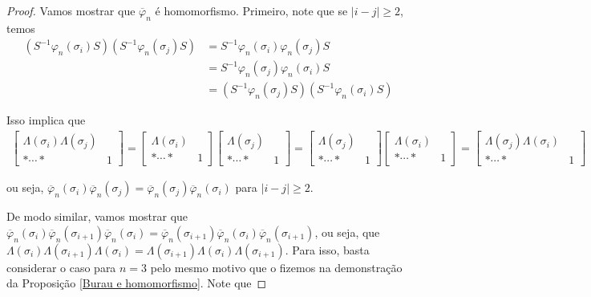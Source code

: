 	\begin{proof}
		Vamos mostrar que $\overline{\varphi}_n$ é homomorfismo. Primeiro, note que se $|i-j|\geq 2$, temos
		\begin{align*}
		(S^{-1}\varphi_n(\sigma_i)S)(S^{-1}\varphi_n(\sigma_j)S) &= S^{-1}\varphi_n(\sigma_i)\varphi_n(\sigma_j)S \\ 
		&= S^{-1}\varphi_n(\sigma_j)\varphi_n(\sigma_i)S \\
		&= (S^{-1}\varphi_n(\sigma_j)S)(S^{-1}\varphi_n(\sigma_i)S)
		\end{align*}
		\par\vspace{0.3cm} Isso implica que
		\begin{align*}
		\left[ \begin{array}{c|c}
		\Lambda(\sigma_i)\Lambda(\sigma_j) & \\
		\hline
		\ast\cdots\ast & 1
		\end{array}\right] = 
		\left[ \begin{array}{c|c}
		\Lambda(\sigma_i) & \\
		\hline
		\ast\cdots\ast & 1
		\end{array}\right]\left[ \begin{array}{c|c}
		\Lambda(\sigma_j) & \\
		\hline
		\ast\cdots\ast & 1
		\end{array}\right]  = \left[\begin{array}{c|c}
		\Lambda(\sigma_j) & \\
		\hline
		\ast\cdots\ast & 1
		\end{array}\right]\left[ \begin{array}{c|c}
		\Lambda(\sigma_i) & \\
		\hline
		\ast\cdots\ast & 1
		\end{array}\right] =  \left[\begin{array}{c|c}
		\Lambda(\sigma_j)\Lambda(\sigma_i) & \\
		\hline
		\ast\cdots\ast & 1
		\end{array}\right]
		\end{align*}
		\par\vspace{0.3cm} ou seja, $\overline{\varphi}_n(\sigma_i)\overline{\varphi}_n(\sigma_j) = \overline{\varphi}_n(\sigma_j)\overline{\varphi}_n(\sigma_i)$ para $|i-j|\geq 2$.
		\par\vspace{0.3cm} De modo similar, vamos mostrar que $\overline{\varphi}_n(\sigma_i)\overline{\varphi}_n(\sigma_{i+1})\overline{\varphi}_n(\sigma_i) = \overline{\varphi}_n(\sigma_{i+1})\overline{\varphi}_n(\sigma_i)\overline{\varphi}_n(\sigma_{i+1})$, ou seja, que $\Lambda(\sigma_i)\Lambda(\sigma_{i+1})\Lambda(\sigma_i) = \Lambda(\sigma_{i+1})\Lambda(\sigma_i)\Lambda(\sigma_{i+1})$. Para isso, basta considerar o caso para $n=3$ pelo mesmo motivo que o fizemos na demonstração da Proposição \eqref{Burau e homomorfismo}. Note que

\end{proof}
